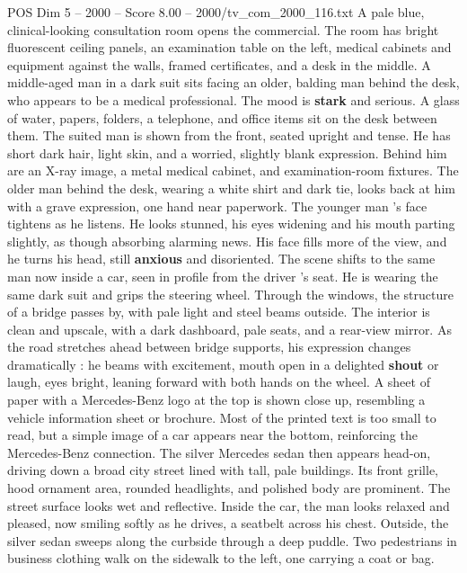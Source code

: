\begin{textsample}{POS Dim 5 – 2000 – Score 8.00 – 2000/tv\_com\_2000\_116.txt}  \label{ex:f5_pos_028}
A pale blue, clinical-looking consultation room opens the commercial.
The room has bright fluorescent ceiling panels, an examination table on the left, medical cabinets and equipment against the walls, framed certificates, and a desk in the middle.
A middle-aged man in a dark suit sits facing an older, balding man behind the desk, who appears to be a medical professional.
The mood is \textbf{stark} and serious.
A glass of water, papers, folders, a telephone, and office items sit on the desk between them.
The suited man is shown from the front, seated upright and tense.
He has short dark hair, light skin, and a worried, slightly blank expression.
Behind him are an X-ray image, a metal medical cabinet, and examination-room fixtures.
The older man behind the desk, wearing a white shirt and dark tie, looks back at him with a grave expression, one hand near paperwork.
The younger man ’s face tightens as he listens.
He looks stunned, his eyes widening and his mouth parting slightly, as though absorbing alarming news.
His face fills more of the view, and he turns his head, still \textbf{anxious} and disoriented.
The scene shifts to the same man now inside a car, seen in profile from the driver ’s seat.
He is wearing the same dark suit and grips the steering wheel.
Through the windows, the structure of a bridge passes by, with pale light and steel beams outside.
The interior is clean and upscale, with a dark dashboard, pale seats, and a rear-view mirror.
As the road stretches ahead between bridge supports, his expression changes dramatically : he beams with excitement, mouth open in a delighted \textbf{shout} or laugh, eyes bright, leaning forward with both hands on the wheel.
A sheet of paper with a Mercedes-Benz logo at the top is shown close up, resembling a vehicle information sheet or brochure.
Most of the printed text is too small to read, but a simple image of a car appears near the bottom, reinforcing the Mercedes-Benz connection.
The silver Mercedes sedan then appears head-on, driving down a broad city street lined with tall, pale buildings.
Its front grille, hood ornament area, rounded headlights, and polished body are prominent.
The street surface looks wet and reflective.
Inside the car, the man looks relaxed and pleased, now smiling softly as he drives, a seatbelt across his chest.
Outside, the silver sedan sweeps along the curbside through a deep puddle.
Two pedestrians in business clothing walk on the sidewalk to the left, one carrying a coat or bag.

\end{textsample}
